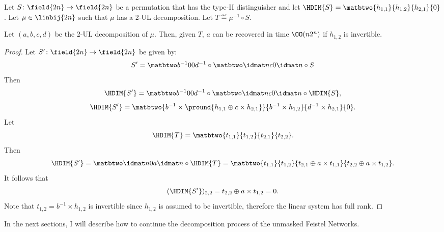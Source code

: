 
\begin{theorem}
Let $S\colon \field{2n} \to \field{2n}$ be a permutation that has the type-II distinguisher and let $\HDIM{S} = \matbtwo{h_{1,1}}{h_{1,2}}{h_{2,1}}{0}$. Let $\mu \in \linbij{2n}$ such that $\mu$ has a 2-UL decomposition. Let $T \eqdef \mu^{-1} \circ S$.

Let $(a,b,c,d)$ be the 2-UL decomposition of $\mu$.
Then, given $T$, $a$ can be recovered in time $\OO(n2^n)$ if $h_{1,2}$ is invertible.
\end{theorem}
\begin{proof}
Let $S'\colon \field{2n}\to \field{2n}$ be given by:
$$
S' = \diag{b^{-1}}{d^{-1}} \compos \idup{c} \compos S
$$
Then
$$
\HDIM{S'} = \diag{b^{-1}}{d^{-1}} \compos \idup{c} \compos \HDIM{S},
$$
$$
\HDIM{S'} = \matbtwo{b^{-1}\times \pround{h_{1,1} \oplus c\times h_{2,1}}}{b^{-1}\times h_{1,2}}{d^{-1}\times h_{2,1} }{0}.
$$
Let 
$$
\HDIM{T} = \matbtwo{t_{1,1}}{t_{1,2}}{t_{2,1}}{t_{2,2}}.
$$
Then
$$
\HDIM{S'} = \idlo{a} \compos \HDIM{T} = \matbtwo{t_{1,1}}{t_{1,2}}{t_{2,1}\oplus a \times t_{1,1}}{t_{2,2} \oplus a \times t_{1,2}}.
$$
It follows that 
$$
(\HDIM{S'})_{2,2} = t_{2,2} \oplus a \times t_{1,2} = 0.
$$
Note that $t_{1,2} = b^{-1}\times h_{1,2}$ is invertible since $h_{1,2}$ is assumed to be invertible, therefore the linear system has full rank.
\end{proof}


In the next sections, I will describe how to continue the decomposition process of the unmasked Feistel Networks.